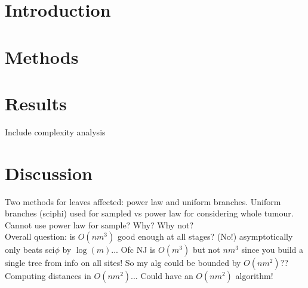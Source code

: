 \documentclass{article}
\begin{document}
\doublespacing



\section{Introduction}


\section{Methods}


\section{Results}
Include complexity analysis
\section{Discussion}

Two methods for leaves affected: power law and uniform branches. Uniform branches (sciphi) used for sampled vs power law for considering whole tumour. Cannot use power law for sample? Why? Why not?\\
Overall question: is $O(nm^3)$ good enough at all stages? (No!) asymptotically only beats sci$\phi$ by $\log(m)$... Ofc NJ is $O(m^3)$ but not $nm^3$ since you build a single tree from info on all sites! So my alg could be bounded by $O(nm^2)$?? Computing distances in $O(nm^2)$... Could have an $O(nm^2)$ algorithm! 




\newpage
{}


\newpage
\appendix

\end{document}
